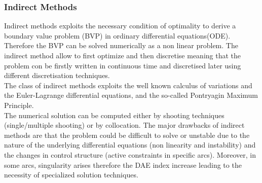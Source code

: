 \subsubsection{Indirect Methods}
%
Indirect methods exploits the necessary condition of optimality to derive a boundary value problem (BVP) in ordinary differential equations(ODE). Therefore the BVP can be solved numerically as a non linear problem. The indirect method allow to first optimize and then discretise meaning that the problem con be firstly written in continuous time and discretised later using different discretisation techniques.\\
The class of indirect methods exploits the well known calculus of variations and the Euler-Lagrange differential equations, and the so-called Pontryagin Maximum Principle.\cite{bertolazzi2006symbolic} \\
The numerical solution can be computed either by shooting techniques (single/multiple shooting) or by collocation.
The major drawbacks of indirect methods are that the problem could be difficult to solve or unstable due to the nature of the underlying differential equations (non linearity and instability) and the changes in control structure (active constraints in specific arcs). Moreover, in some arcs, singularity arises therefore the DAE index increase leading to the necessity of specialized solution techniques. \cite{biral2016notes}
%
%
